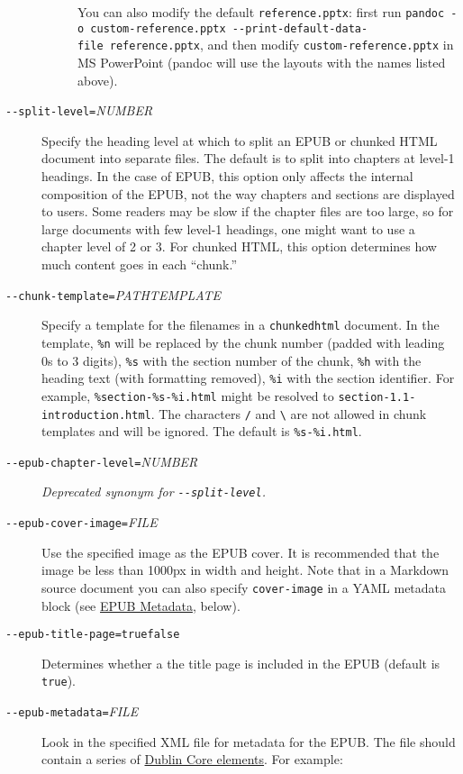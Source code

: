 \documentclass[
  a4paper,
]{article}
\begin{document}
\begin{description}
\begin{description}
You can also modify the default \texttt{reference.pptx}: first run
\texttt{pandoc\ -o\ custom-reference.pptx\ -\/-print-default-data-file\ reference.pptx},
and then modify \texttt{custom-reference.pptx} in MS PowerPoint (pandoc
will use the layouts with the names listed above).
\end{description}
\item[\texttt{-\/-split-level=}\emph{NUMBER}]
Specify the heading level at which to split an EPUB or chunked HTML
document into separate files. The default is to split into chapters at
level-1 headings. In the case of EPUB, this option only affects the
internal composition of the EPUB, not the way chapters and sections are
displayed to users. Some readers may be slow if the chapter files are
too large, so for large documents with few level-1 headings, one might
want to use a chapter level of 2 or 3. For chunked HTML, this option
determines how much content goes in each ``chunk.''
\item[\texttt{-\/-chunk-template=}\emph{PATHTEMPLATE}]
Specify a template for the filenames in a \texttt{chunkedhtml} document.
In the template, \texttt{\%n} will be replaced by the chunk number
(padded with leading 0s to 3 digits), \texttt{\%s} with the section
number of the chunk, \texttt{\%h} with the heading text (with formatting
removed), \texttt{\%i} with the section identifier. For example,
\texttt{\%section-\%s-\%i.html} might be resolved to
\texttt{section-1.1-introduction.html}. The characters \texttt{/} and
\texttt{\textbackslash{}} are not allowed in chunk templates and will be
ignored. The default is \texttt{\%s-\%i.html}.
\item[\texttt{-\/-epub-chapter-level=}\emph{NUMBER}]
\emph{Deprecated synonym for \texttt{-\/-split-level}.}
\item[\texttt{-\/-epub-cover-image=}\emph{FILE}]
Use the specified image as the EPUB cover. It is recommended that the
image be less than 1000px in width and height. Note that in a Markdown
source document you can also specify \texttt{cover-image} in a YAML
metadata block (see \protect\hyperlink{epub-metadata}{EPUB Metadata},
below).
\item[\texttt{-\/-epub-title-page=true}\textbar{}\texttt{false}]
Determines whether a the title page is included in the EPUB (default is
\texttt{true}).
\item[\texttt{-\/-epub-metadata=}\emph{FILE}]
Look in the specified XML file for metadata for the EPUB. The file
should contain a series of
\href{https://www.dublincore.org/specifications/dublin-core/dces/}{Dublin
Core elements}. For example:


\end{description}
\end{document}
